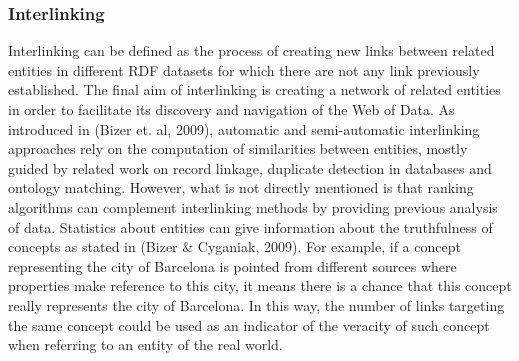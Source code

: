 \subsubsection{Interlinking}
Interlinking can be defined as the process of creating new links between related entities in different RDF datasets for which there are not any link previously established. The final aim of interlinking is creating a network of related entities in order to facilitate its discovery and navigation of the Web of Data.
As introduced in (Bizer et. al, 2009), automatic and semi-automatic interlinking approaches rely on the computation of similarities between entities, mostly guided by related work on record linkage, duplicate detection in databases and ontology matching. However, what is not directly mentioned is that ranking algorithms can complement interlinking methods by providing previous analysis of data. Statistics about entities can give information about the truthfulness of concepts as stated in (Bizer \& Cyganiak, 2009). For example, if a concept representing the city of Barcelona is pointed from different sources where properties make reference to this city, it means there is a chance that this concept really represents the city of Barcelona. In this way, the number of links targeting the same concept could be used as an indicator of the veracity of such concept when referring to an entity of the real world.